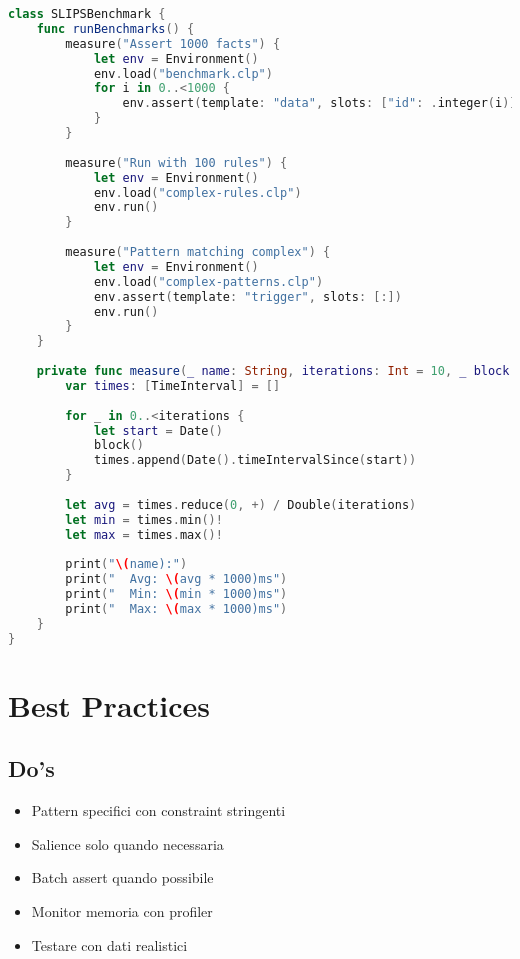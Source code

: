 \begin{lstlisting}[language=Swift]
class SLIPSBenchmark {
    func runBenchmarks() {
        measure("Assert 1000 facts") {
            let env = Environment()
            env.load("benchmark.clp")
            for i in 0..<1000 {
                env.assert(template: "data", slots: ["id": .integer(i)])
            }
        }
        
        measure("Run with 100 rules") {
            let env = Environment()
            env.load("complex-rules.clp")
            env.run()
        }
        
        measure("Pattern matching complex") {
            let env = Environment()
            env.load("complex-patterns.clp")
            env.assert(template: "trigger", slots: [:])
            env.run()
        }
    }
    
    private func measure(_ name: String, iterations: Int = 10, _ block: () -> Void) {
        var times: [TimeInterval] = []
        
        for _ in 0..<iterations {
            let start = Date()
            block()
            times.append(Date().timeIntervalSince(start))
        }
        
        let avg = times.reduce(0, +) / Double(iterations)
        let min = times.min()!
        let max = times.max()!
        
        print("\(name):")
        print("  Avg: \(avg * 1000)ms")
        print("  Min: \(min * 1000)ms")
        print("  Max: \(max * 1000)ms")
    }
}
\end{lstlisting}

\section{Best Practices}

\subsection{Do's}

\begin{infobox}[Raccomandazioni]
\begin{itemize}
\item Pattern specifici con constraint stringenti
\item Salience solo quando necessaria
\item Batch assert quando possibile
\item Monitor memoria con profiler
\item Testare con dati realistici
\end{itemize}
\end{infobox}

